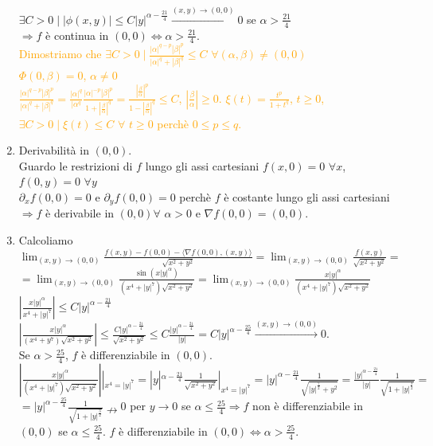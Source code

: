 \documentclass{article}
\begin{document}
\begin{enumerate}
     $ \exists  C > 0 \mid |\phi(x,y)|\leq C|y|^{\alpha-\frac{21}{4}}\xrightarrow{(x,y)\rightarrow(0,0)} 0$ se $\alpha > \frac{21}{4}$\\
     $\Rightarrow f$ è continua in $(0,0)\Leftrightarrow \alpha> \frac{21}{4}$.\\
     \textcolor{orange}{Dimostriamo che $\exists C > 0 \mid \frac{|\alpha|^{q-p}|\beta|^{p}}{|\alpha|^q+|\beta|^q}\leq C\,\, \forall (\alpha,\beta)\neq(0,0)$\\
     $\Phi(0,\beta)=0$, $\alpha \neq 0$\\
     $\frac{|\alpha|^{q-p}|\beta|^p}{|\alpha|^q+|\beta|^q}=\frac{|\alpha|^q}{|\alpha^q}\frac{|\alpha|^{-p}|\beta|^p}{1+|\frac{\beta}{\alpha}|^q}=\frac{|\frac{\beta}{\alpha}|^p}{1-|\frac{\beta}{\alpha}|^q}\leq C$, $|\frac{\beta}{\alpha}|\geq 0$.}
     \textcolor{orange}{$\xi(t)=\frac{t^p}{1+t^q}$, $t\geq 0$, $\exists C > 0 \mid \xi(t)\leq C \,\, \forall\,\, t \geq 0$ perchè $0 \leq p \leq q$.}
     
     
    \item Derivabilità in $(0,0)$.\\
    Guardo le restrizioni di $f$ lungo gli assi cartesiani $f(x,0)=0\,\, \forall x$, $f(0,y)=0\,\, \forall y$\\
    $\partial_xf(0,0)=0$ e $\partial_yf(0,0)=0$ perchè $f$ è costante lungo gli assi cartesiani $\Rightarrow f$ è derivabile in $(0,0) \forall \,\, \alpha >0$ e $\nabla f(0,0)=(0,0)$.
    
    \item Calcoliamo $\lim_{(x,y)\rightarrow(0,0)}\frac{f(x,y)-f(0,0)-\langle \nabla f(0,0),(x,y) \rangle}{\sqrt{x^2+y^2}}=\lim_{(x,y)\rightarrow(0,0)}\frac{f(x,y)}{\sqrt{x^2+y^2}}=$\\$=\lim_{(x,y)\rightarrow(0,0)}\frac{\sin(x|y|^\alpha)}{(x^4+|y|^7)\sqrt{x^2+y^2}}=\lim_{(x,y)\rightarrow(0,0)}\frac{x|y|^\alpha}{(x^4+|y|^7)\sqrt{x^2+y^2}}$\\
    $|\frac{x|y|^\alpha}{x^4+|y|^7}|\leq C|y|^{\alpha-\frac{21}{4}}$\\
    $|\frac{x|y|^\alpha}{(x^4+y^7)\sqrt{x^2+y^2}}|\leq \frac{C|y|^{\alpha-\frac{21}{4}}}{\sqrt{x^2+y^2}}\leq C \frac{|y|^{\alpha-\frac{21}{4}}}{|y|}=C |y|^{\alpha -\frac{25}{4}}\xrightarrow{(x,y)\rightarrow(0,0)}0 $.\\
    Se $\alpha > \frac{25}{4}$, $f$ è differenziabile in $(0,0)$.\\
    $|\frac{x|y|^\alpha}{(x^4+|y|^7)\sqrt{x^2+y^2}}||_{x^4=|y|^7}=|y|^{\alpha -\frac{21}{4}}\frac{1}{\sqrt{x^2+y^2}}|_{x^4=|y|^7}=|y|^{\alpha-\frac{21}{4}}\frac{1}{\sqrt{|y|^{\frac{7}{2}}+y^2}}=\frac{|y|^{\alpha-\frac{21}{4}}}{|y|}\frac{1}{\sqrt{1+|y|^{\frac{3}{2}}}}=$\\
    $=|y|^{\alpha-\frac{25}{4}}\frac{1}{\sqrt{1+|y|^{\frac{3}{2}}}}\nrightarrow 0$ per $y \rightarrow 0$ se $\alpha \leq \frac{25}{4} \Rightarrow f$ non è differenziabile in $(0,0)$ se $\alpha \leq \frac{25}{4}$. $f$ è differenziabile in $(0,0)\Leftrightarrow \alpha > \frac{25}{4}$. 
\end{enumerate}
\end{document}
